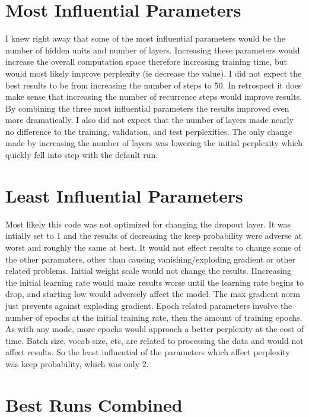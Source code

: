 \documentclass[10pt,a4paper]{report}
\begin{document}
\clearpage

\section{Most Influential Parameters}

I knew right away that some of the most influential parameters would be the number of hidden units and number of layers. Increasing these parameters would increase the overall computation space therefore increasing training time, but would most likely improve perplexity (ie decrease the value). I did not expect the best results to be from increasing the number of steps to 50. In retrospect it does make sense that increasing the number of recurrence steps would improve results. By combining the three most influential parameters the results improved even more dramatically. I also did not expect that the number of layers made nearly no difference to the training, validation, and test perplexities. The only change made by increasing the number of layers was lowering the initial perplexity which quickly fell into step with the default run.

\section{Least Influential Parameters}

Most likely this code was not optimized for changing the dropout layer. It was intially set to 1 and the results of decreasing the keep probability were adverse at worst and roughly the same at best. It would not effect results to change some of the other paramaters, other than causing vanishing/exploding gradient or other related problems. Initial weight scale would not change the results. IIncreasing the initial learning rate would make results worse until the learning rate begins to drop, and starting low would adversely affect the model. The max gradient norm just prevents against exploding gradient. Epoch related parameters involve the number of epochs at the initial training rate, then the amount of training epochs. As with any mode, more epochs would approach a better perplexity at the cost of time. Batch size, vocab size, etc, are related to processing the data and would not affect results. So the least influential of the parameters which affect perplexity was keep probability, which was only 2.

\section{Best Runs Combined}
\end{document}
